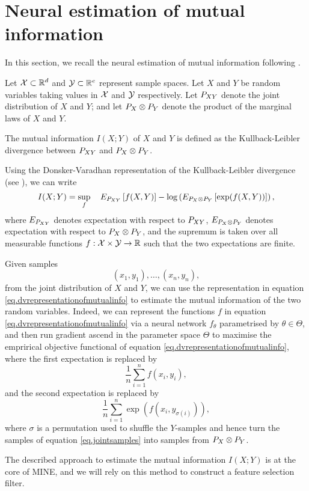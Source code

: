 \section{Neural estimation of mutual information}
\label{sec.mine}

In this section,
we recall the neural estimation of mutual information
following
\cite{BBROBCH18mut}.




Let 
$\mathcal{X} \subset \mathbb{R}^{d}$
and 
$\mathcal{Y} \subset \mathbb{R}^{e}$
represent sample spaces.
Let 
$X$
and 
$Y$
be random variables taking values in 
$\mathcal{X}$
and 
$\mathcal{Y}$
respectively.
Let 
${{P}}_{XY}$ 
denote the joint distribution of 
$X$
and
$Y$; 
and let 
${{P}}_{X} \otimes {{P}}_{Y}$
denote the
product of the marginal
laws of $X$ and $Y$.

The mutual information 
$I(X; Y)$
of 
$X$ 
and 
$Y$
is defined as the 
Kullback-Leibler
divergence 
between
${{P}}_{XY}$ 
and
${{P}}_{X} \otimes {{P}}_{Y}$.

Using the Donsker-Varadhan representation of the 
Kullback-Leibler
divergence 
(see \cite{DV83asy}),
we can write
\begin{equation}
	\label{eq.dvrepresentationofmutualinfo}
	I(X; Y)
	= 
	\sup_{f}
	\quad
	{{E}}_{{{P}}_{XY}}
	\left[
		f(X, Y)
	\right]
        - \log
	\left(
	{{E}}_{{{P}}_{X} \otimes {{P}}_{Y}}
	\left[
		\exp(f(X, Y))
	\right]
	\right),
\end{equation}
where 
${{E}}_{{{P}}_{XY}}$ 
denotes expectation with respect to 
${{P}}_{XY}$,
${{E}}_{{{P}}_{X} \otimes {{P}}_{Y}}$ 
denotes expectation with respect to 
${{P}}_{X} \otimes {{P}}_{Y}$,
and
the supremum is taken over 
all measurable functions 
$f: \mathcal{X} \times \mathcal{Y} \rightarrow \mathbb{R}$ 
such that the two expectations are finite.

Given samples 
\begin{equation}
	\label{eq.jointsamples}
	(x_1, y_1), 
	\dots,
	(x_n, y_n), 
\end{equation}
from the joint distribution of $X$ and $Y$,
we can use the representation
in equation \eqref{eq.dvrepresentationofmutualinfo}
to 
estimate the mutual information of the two random variables.
Indeed,
we can  represent the functions
$f$
in equation \eqref{eq.dvrepresentationofmutualinfo}
via a neural network 
$f_\theta$ 
parametrised by $\theta \in \Theta$,
and then 
run gradient ascend in the parameter space $\Theta$ to
maximise 
the emprirical objective functional of equation \eqref{eq.dvrepresentationofmutualinfo}, 
where
the first expectation is replaced by 
\begin{equation*}
	\frac{1}{n}\sum_{i=1}^{n} f(x_i, y_i),
\end{equation*}
and the second expectation is replaced by 
\begin{equation*}
	\frac{1}{n}\sum_{i=1}^{n} \exp\left(
	f(x_i, y_{\sigma(i)})
	\right),
\end{equation*}
where $\sigma$ is a permutation 
used to shuffle 
the $Y$-samples 
and 
hence turn the samples of equation \eqref{eq.jointsamples}
into samples from 
${{P}}_{X} \otimes {{P}}_{Y}$.

The described approach to 
estimate the mutual information 
$I(X; Y)$
is at the core of MINE, 
and we will rely on this method 
to construct a feature selection filter. 








